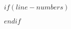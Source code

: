 \usepackage{moreverb}
\usepackage{url}
\usepackage{grffile}
\usepackage[UKenglish]{isodate}


\def\volumeyear{$date$}


$if(line-numbers)$
\usepackage{lineno}
\linenumbers
$endif$


